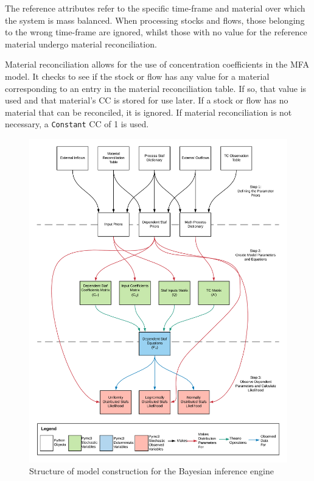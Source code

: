 \documentclass[ %
                    author={Tom Jager},
                supervisor={Dr. Daniel Schien},
                    degree={MEng},
                     title={A Bayesian Inference Engine for Calibrating Uncertainty over UMIS Structured MFA Systems},
                  subtitle={},
                      type={research},
                      year={2019} ]{dissertation}
\begin{document}
The reference attributes refer to the specific time-frame and material over which the system is mass balanced. When processing stocks and flows, those belonging to the wrong time-frame are ignored, whilst those with no value for the reference material undergo material reconciliation. 

Material reconciliation allows for the use of concentration coefficients in the MFA model. It checks to see if the stock or flow has any value for a material corresponding to an entry in the material reconciliation table. If so, that value is used and that material's CC is stored for use later. If a stock or flow has no material that can be reconciled, it is ignored. If material reconciliation is not necessary, a \texttt{Constant} CC of 1 is used.


\begin{figure}
    \centering
    \includegraphics[width=\linewidth]{images/inference_engine_structure.png}
    \caption{Structure of model construction for the Bayesian inference engine}
    \label{fig:inference_engine_structure}
\end{figure}
\restoregeometry
\end{document}
